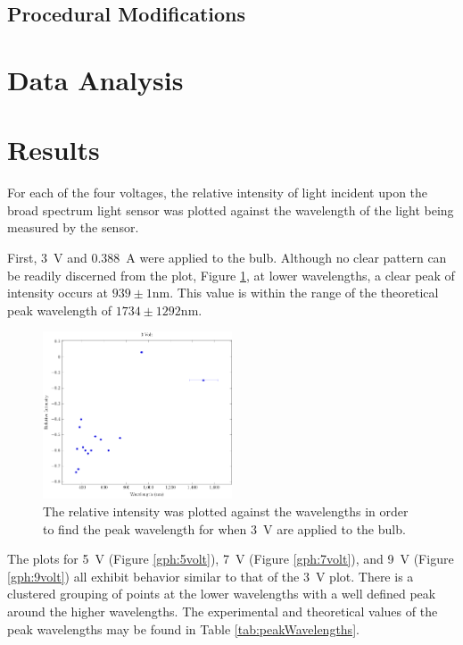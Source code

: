 \documentclass[a4paper]{article}
\begin{document}
\subsection{Procedural Modifications}
\qq 

\section{Data Analysis}


\section{Results}

\qq For each of the four voltages, the relative intensity of light incident upon
the broad spectrum light sensor was plotted against the wavelength of the light
being measured by the sensor.

\qq First, \SI{3}{\volt} and \SI{0.388}{\ampere} were applied to the
bulb. Although no clear pattern can be readily discerned from the plot, Figure
\ref{gph:3volt}, at lower wavelengths, a clear peak of intensity occurs at
\( 939 \pm 1 \si{\nano\meter} \). This value is within the range of the
theoretical peak wavelength of \( 1734 \pm 1292 \si{\nano\meter} \). 

\begin{figure}[H]
  \begin{center}
    \includegraphics[width=0.5\textwidth]{P6-BlackbodyRadiation/Plots/3Volt/3volt.pdf}
  \end{center}
  \label{gph:3volt}
  \caption{The relative intensity was plotted against the wavelengths in order
    to find the peak wavelength for when \SI{3}{\volt} are applied to the bulb.}
\end{figure}

\qq The plots for \SI{5}{\volt} (Figure \ref{gph:5volt}), \SI{7}{\volt} (Figure
\ref{gph:7volt}), and \SI{9}{\volt} (Figure \ref{gph:9volt}) all exhibit
behavior similar to that of the \SI{3}{\volt} plot. There is a clustered
grouping of points at the lower wavelengths with a well defined peak around the
higher wavelengths. The experimental and theoretical values of the peak
wavelengths may be found in Table \ref{tab:peakWavelengths}. 
\end{document}
